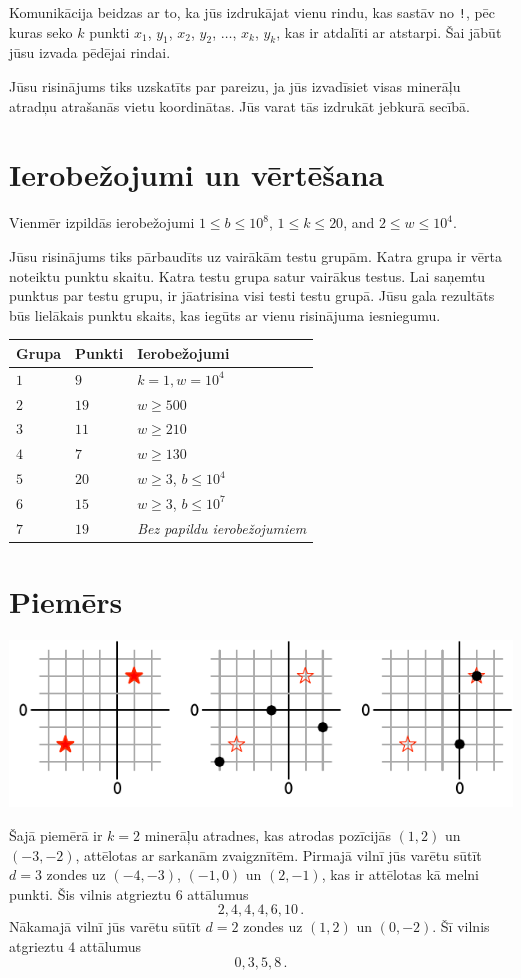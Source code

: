 Komunikācija beidzas ar to, ka jūs izdrukājat vienu rindu, kas sastāv no \texttt{!}, pēc kuras seko $k$ punkti $x_1$, $y_1$, $x_2$, $y_2$, $\ldots$, $x_k$, $y_k$, kas ir atdalīti ar atstarpi.
Šai jābūt jūsu izvada pēdējai rindai.

Jūsu risinājums tiks uzskatīts par pareizu, ja jūs izvadīsiet visas minerāļu atradņu atrašanās vietu koordinātas.
Jūs varat tās izdrukāt jebkurā secībā.

\section*{Ierobežojumi un vērtēšana}

Vienmēr izpildās ierobežojumi
$1\leq b \leq 10^8$, %
$1 \leq k \leq 20$, %
and
$2 \le w \le 10^4$. %

Jūsu risinājums tiks pārbaudīts uz vairākām testu grupām. Katra grupa ir vērta noteiktu punktu skaitu.
Katra testu grupa satur vairākus testus.
Lai saņemtu punktus par testu grupu, ir jāatrisina visi testi testu grupā.
Jūsu gala rezultāts būs lielākais punktu skaits, kas iegūts ar vienu risinājuma iesniegumu.

\medskip
\begin{tabular}{lll}
Grupa & Punkti & Ierobežojumi \\\hline
  $1$ & $9$ & $k = 1, w = 10^4$\\
  $2$ & $19$ & $w \ge 500$\\
  $3$ & $11$ & $w \ge 210$\\
  $4$ & $7$ & $w \ge 130$\\
  $5$ & $20$ & $w \ge 3$, $b \le 10^4$\\
  $6$ & $15$ & $w \ge 3$, $b \le 10^7$\\
  $7$ & $19$ & \emph{Bez papildu ierobežojumiem}
\end{tabular}

\section*{Piemērs}

\includegraphics[width=.6\textwidth]{img/sample1.pdf}

Šajā piemērā ir $k=2$ minerāļu atradnes, kas atrodas pozīcijās $(1,2)$ un $(-3,-2)$, attēlotas ar sarkanām zvaigznītēm.
Pirmajā vilnī jūs varētu sūtīt $d=3$ zondes uz $(-4,-3)$, $(-1, 0)$ un $(2,-1)$, kas ir attēlotas kā melni punkti.
Šis vilnis atgrieztu $6$ attālumus \[
  2, 4, 4, 4, 6, 10\,.
\]
Nākamajā vilnī jūs varētu sūtīt $d=2$ zondes uz $(1,2)$ un $(0,-2)$.
Šī vilnis atgrieztu $4$ attālumus \[
  0, 3, 5, 8\,.
\]
